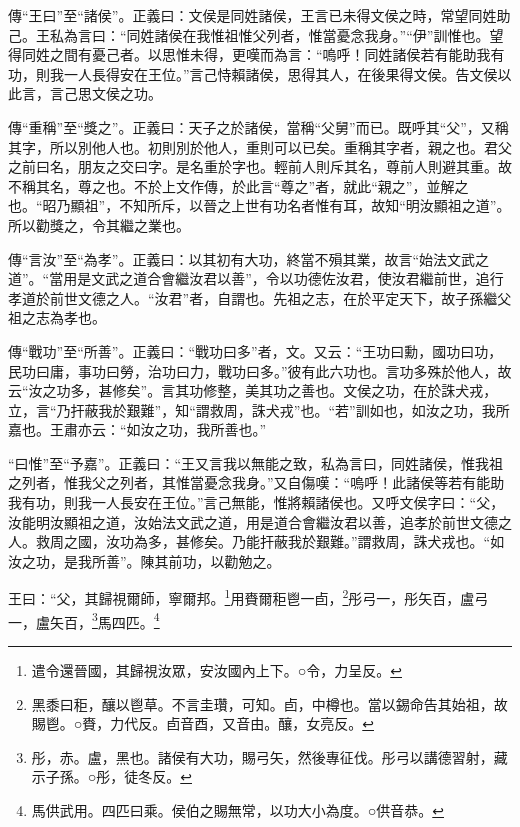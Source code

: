 {\noindent\zhuan{}\fzbyks 傳“王曰”至“諸侯”。正義曰：文侯是同姓諸侯，王言已未得文侯之時，常望同姓助己。王私為言曰：“同姓諸侯在我惟祖惟父列者，惟當憂念我身。”“伊”訓惟也。望得同姓之間有憂己者。以思惟未得，更嘆而為言：“嗚呼！同姓諸侯若有能助我有功，則我一人長得安在王位。”言己恃賴諸侯，思得其人，在後果得文侯。告文侯以此言，言己思文侯之功。 \par}

{\noindent\zhuan{}\fzbyks 傳“重稱”至“獎之”。正義曰：天子之於諸侯，當稱“父舅”而已。既呼其“父”，又稱其字，所以別他人也。初則別於他人，重則可以已矣。重稱其字者，親之也。君父之前曰名，朋友之交曰字。是名重於字也。輕前人則斥其名，尊前人則避其重。故不稱其名，尊之也。不於上文作傳，於此言“尊之”者，就此“親之”，並解之也。“昭乃顯祖”，不知所斥，以晉之上世有功名者惟有耳，故知“明汝顯祖之道”。所以勸獎之，令其繼之業也。 \par}

{\noindent\zhuan{}\fzbyks 傳“言汝”至“為孝”。正義曰：以其初有大功，終當不殞其業，故言“始法文武之道”。“當用是文武之道合會繼汝君以善”，令以功德佐汝君，使汝君繼前世，追行孝道於前世文德之人。“汝君”者，自謂也。先祖之志，在於平定天下，故子孫繼父祖之志為孝也。 \par}

{\noindent\zhuan{}\fzbyks 傳“戰功”至“所善”。正義曰：“戰功曰多”者，文。又云：“王功曰勳，國功曰功，民功曰庸，事功曰勞，治功曰力，戰功曰多。”彼有此六功也。言功多殊於他人，故云“汝之功多，甚修矣”。言其功修整，美其功之善也。文侯之功，在於誅犬戎，立，言“乃扞蔽我於艱難”，知“謂救周，誅犬戎”也。“若”訓如也，如汝之功，我所嘉也。王肅亦云：“如汝之功，我所善也。” \par}

{\noindent\shu{}\fzkt “曰惟”至“予嘉”。正義曰：“王又言我以無能之致，私為言曰，同姓諸侯，惟我祖之列者，惟我父之列者，其惟當憂念我身。”又自傷嘆：“嗚呼！此諸侯等若有能助我有功，則我一人長安在王位。”言己無能，惟將賴諸侯也。又呼文侯字曰：“父，汝能明汝顯祖之道，汝始法文武之道，用是道合會繼汝君以善，追孝於前世文德之人。救周之國，汝功為多，甚修矣。乃能扞蔽我於艱難。”謂救周，誅犬戎也。“如汝之功，是我所善”。陳其前功，以勸勉之。 \par}

王曰：“父，其歸視爾師，寧爾邦。\footnote{遣令還晉國，其歸視汝眾，安汝國內上下。○令，力呈反。}用賚爾秬鬯一卣，\footnote{黑黍曰秬，釀以鬯草。不言圭瓚，可知。卣，中樽也。當以錫命告其始祖，故賜鬯。○賚，力代反。卣音酉，又音由。釀，女亮反。}彤弓一，彤矢百，盧弓一，盧矢百，\footnote{彤，赤。盧，黑也。諸侯有大功，賜弓矢，然後專征伐。彤弓以講德習射，藏示子孫。○彤，徒冬反。}馬四匹。\footnote{馬供武用。四匹曰乘。侯伯之賜無常，以功大小為度。○供音恭。}



